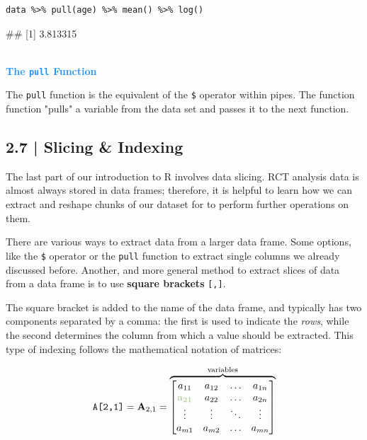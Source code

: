 \begin{lstlisting}
data %>% pull(age) %>% mean() %>% log()
\end{lstlisting}
\begin{example}
## [1] 3.813315
\end{example}

\begin{box-info} \\

\textcolor{dodgerblue}{\textbf{The \texttt{pull} Function}}

\vspace{2mm}

The \texttt{pull} function is the equivalent of the \texttt{\$} operator within pipes. The function function "pulls" a variable from the data set and passes it to the next function.
\end{box-info}

\subsection{{\normalfont\textsf{\textcolor{sBlue}{\small 2.7 |}}} Slicing \& Indexing}

The last part of our introduction to \textsf{R} involves data slicing. RCT analysis data is almost always stored in data frames; therefore, it is helpful to learn how we can extract and reshape chunks of our dataset for to perform further operations on them.

There are various ways to extract data from a larger data frame. Some options, like the \texttt{\$} operator or the \texttt{pull} function to extract single columns we already discussed before. Another, and more general method to extract slices of data from a data frame is to use \textbf{square brackets} \texttt{[,]}. 

The square bracket is added to the name of the data frame, and typically has two components separated by a comma: the first is used to indicate the \emph{rows}, while the second determines the column from which a value should be extracted. This type of indexing follows the mathematical notation of matrices:


\begin{align*}
\texttt{A[2,1]} = 
\mathbf{A}_{2,1} = 
\overbrace{\begin{bmatrix}
a_{11} & a_{12} & \dots & a_{1n}\\
\textcolor{mintygreen}{\mathbf{a_{21}}} & a_{22} & \dots & a_{2n}\\
\vdots & \vdots & \ddots & \vdots\\
a_{m1} & a_{m2} & \dots & a_{mn}
\end{bmatrix}}^{\text{variables}}
\end{align*}


